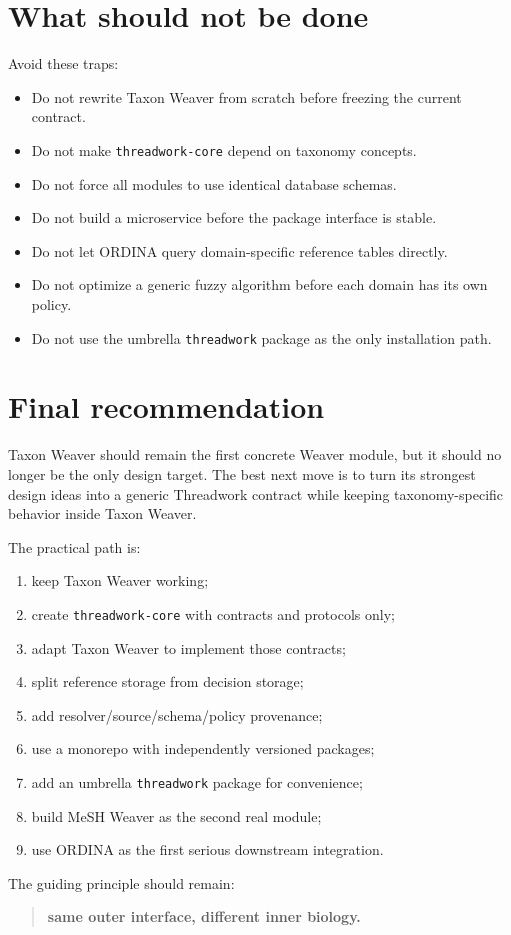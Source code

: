 \documentclass[11pt,a4paper]{article}
\newcommand{\code}[1]{\texttt{#1}}
\begin{document}
\section{What should not be done}

Avoid these traps:

\begin{itemize}
  \item Do not rewrite Taxon Weaver from scratch before freezing the current contract.
  \item Do not make \code{threadwork-core} depend on taxonomy concepts.
  \item Do not force all modules to use identical database schemas.
  \item Do not build a microservice before the package interface is stable.
  \item Do not let ORDINA query domain-specific reference tables directly.
  \item Do not optimize a generic fuzzy algorithm before each domain has its own policy.
  \item Do not use the umbrella \code{threadwork} package as the only installation path.
\end{itemize}

\section{Final recommendation}

Taxon Weaver should remain the first concrete Weaver module, but it should no longer be the only design target. The best next move is to turn its strongest design ideas into a generic Threadwork contract while keeping taxonomy-specific behavior inside Taxon Weaver.

The practical path is:

\begin{enumerate}
  \item keep Taxon Weaver working;
  \item create \code{threadwork-core} with contracts and protocols only;
  \item adapt Taxon Weaver to implement those contracts;
  \item split reference storage from decision storage;
  \item add resolver/source/schema/policy provenance;
  \item use a monorepo with independently versioned packages;
  \item add an umbrella \code{threadwork} package for convenience;
  \item build MeSH Weaver as the second real module;
  \item use ORDINA as the first serious downstream integration.
\end{enumerate}

The guiding principle should remain:

\begin{quote}
\textbf{same outer interface, different inner biology.}
\end{quote}
\end{document}

